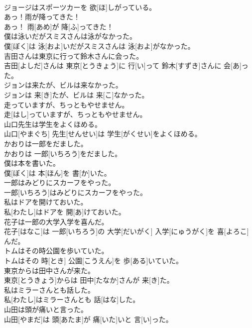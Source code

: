 \documentclass[8pt]{extreport}
\begin{document}
\begin{CJK}{UTF8}{min}
\\	ジョージはスポーツカーを 欲[ほ]しがっている。
\\	あっ！雨が降ってきた！	
\\	あっ！ 雨[あめ]が 降[ふ]ってきた！
\\	僕は泳いだがスミスさんは泳がなかった。	
\\	僕[ぼく]は 泳[およ]いだがスミスさんは 泳[およ]がなかった。
\\	吉田さんは東京に行って鈴木さんに会った。	
\\	吉田[よしだ]さんは 東京[とうきょう]に 行[い]って 鈴木[すずき]さんに 会[あ]った。
\\	ジョンは来たが、ビルは来なかった。	
\\	ジョンは 来[き]たが、ビルは 来[こ]なかった。
\\	走っていますが、ちっともやせません。	
\\	走[はし]っていますが、ちっともやせません。
\\	山口先生は学生をよくほめる。	
\\	山口[やまぐち] 先生[せんせい]は 学生[がくせい]をよくほめる。
\\	かおりは一郎をだました。	
\\	かおりは 一郎[いちろう]をだました。
\\	僕は本を書いた。	
\\	僕[ぼく]は 本[ほん]を 書[か]いた。
\\	一郎はみどりにスカーフをやった。	
\\	一郎[いちろう]はみどりにスカーフをやった。
\\	私はドアを開けておいた。	
\\	私[わたし]はドアを 開[あ]けておいた。
\\	花子は一郎の大学入学を喜んだ。	
\\	花子[はなこ]は 一郎[いちろう]の 大学[だいがく] 入学[にゅうがく]を 喜[よろこ]んだ。
\\	トムはその時公園を歩いていた。	
\\	トムはその 時[とき] 公園[こうえん]を 歩[ある]いていた。
\\	東京からは田中さんが来た。	
\\	東京[とうきょう]からは 田中[たなか]さんが 来[き]た。
\\	私はミラーさんとも話した。	
\\	私[わたし]はミラーさんとも 話[はな]した。
\\	山田は頭が痛いと言った。	
\\	山田[やまだ]は 頭[あたま]が 痛[いた]いと 言[い]った。

\end{CJK}
\end{document}

